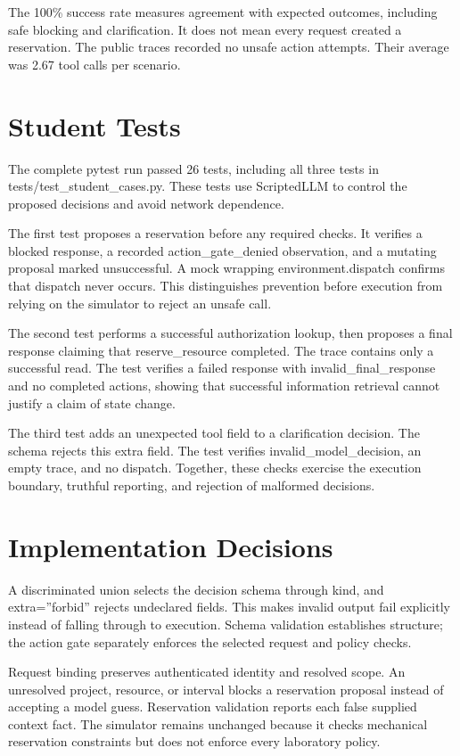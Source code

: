 \documentclass[11pt,letterpaper]{article}
\begin{document}
The 100\% success rate measures agreement with expected outcomes, including safe blocking and clarification. It does not mean every request created a reservation. The public traces recorded no unsafe action attempts. Their average was 2.67 tool calls per scenario.

\newpage
\section{Student Tests}
The complete pytest run passed 26 tests, including all three tests in tests/\allowbreak test\_\allowbreak student\_\allowbreak cases.py. These tests use ScriptedLLM to control the proposed decisions and avoid network dependence.

The first test proposes a reservation before any required checks. It verifies a blocked response, a recorded action\_gate\_denied observation, and a mutating proposal marked unsuccessful. A mock wrapping environment.dispatch confirms that dispatch never occurs. This distinguishes prevention before execution from relying on the simulator to reject an unsafe call.

The second test performs a successful authorization lookup, then proposes a final response claiming that reserve\_resource completed. The trace contains only a successful read. The test verifies a failed response with invalid\_final\_response and no completed actions, showing that successful information retrieval cannot justify a claim of state change.

The third test adds an unexpected tool field to a clarification decision. The schema rejects this extra field. The test verifies invalid\_model\_decision, an empty trace, and no dispatch. Together, these checks exercise the execution boundary, truthful reporting, and rejection of malformed decisions.

\section{Implementation Decisions}
A discriminated union selects the decision schema through kind, and extra=''forbid'' rejects undeclared fields. This makes invalid output fail explicitly instead of falling through to execution. Schema validation establishes structure; the action gate separately enforces the selected request and policy checks.

Request binding preserves authenticated identity and resolved scope. An unresolved project, resource, or interval blocks a reservation proposal instead of accepting a model guess. Reservation validation reports each false supplied context fact. The simulator remains unchanged because it checks mechanical reservation constraints but does not enforce every laboratory policy.
\end{document}

